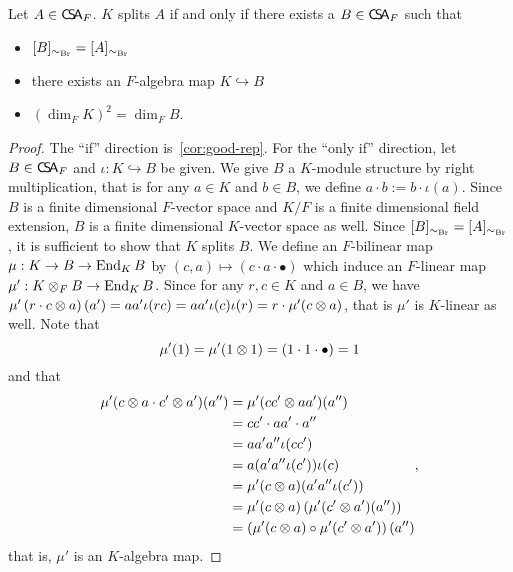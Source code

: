  \begin{theorem}\label{thm:good-rep-iff-split}
   Let $A\in\operatorname{\mathsf{C}\!\mathsf{S}\!\mathsf{A}}_{F}$. $K$ splits $A$ if and only if there exists a $B\in\operatorname{\mathsf{C}\!\mathsf{S}\!\mathsf{A}}_{F}$ such that
   \begin{itemize}
     \item $[B]_{\sim_{\operatorname{Br}}}=[A]_{\sim_{\operatorname{Br}}}$
     \item there exists an $F$-algebra map $K \hookrightarrow B$
     \item ${\left(\dim_{F}K\right)}^{2}=\dim_{F}B$.
   \end{itemize}
   \leanok
 \end{theorem}
 \begin{proof}
   The ``if'' direction is~\cref{cor:good-rep}. For the ``only if'' direction, let $B \in\operatorname{\mathsf{C}\!\mathsf{S}\!\mathsf{A}}_{F}$ and $\iota : K \hookrightarrow B$ be given. We give $B$ a $K$-module structure by right multiplication, that is for any $a \in K$ and $b \in B$, we define $a \cdot b := b \cdot \iota(a)$.
   Since $B$ is a finite dimensional $F$-vector space and $K/F$ is a finite dimensional field extension, $B$ is a finite dimensional $K$-vector space as well. Since $[B]_{\sim_{\operatorname{Br}}}=[A]_{\sim_{\operatorname{Br}}}$, it is sufficient to show that $K$ splits $B$.
   We define an $F$-bilinear map $\mu : K \to B \to \operatorname{End}_{K}B$ by $(c, a) \mapsto (c \cdot a \cdot \bullet)$ which induce an $F$-linear map $\mu' : K \otimes_{F} B \to \operatorname{End}_{K}B$. Since for any $r, c\in K$ and $a \in B$, we have $\mu'\left(r \cdot c\otimes a\right)(a') = a a' \iota(rc)=aa'\iota(c)\iota(r)=r\cdot \mu'(c\otimes a)$, that is $\mu'$ is $K$-linear as well. Note that \[\mu'(1)=\mu'(1\otimes 1) = (1\cdot 1\cdot \bullet) = 1\] and that
   \[
     \begin{aligned}
       \mu'(c\otimes a \cdot c'\otimes a')(a'') &= \mu'(cc'\otimes aa')(a'') \\
                                        &= cc' \cdot aa' \cdot a'' \\
                                        &= aa' a'' \iota(c c') \\
                                        &= a(a' a'' \iota(c'))\iota(c) \\
                                        &=\mu'(c \otimes a)(a' a'' \iota(c'))\\
                                        &=\mu'(c\otimes a)\left(\mu'(c'\otimes a')(a'')\right) \\
                                        &= \left(\mu'(c\otimes a)\circ\mu'(c'\otimes a')\right)(a'')
     \end{aligned},
     \]
     that is, $\mu'$ is an $K$-algebra map.


\end{proof}

